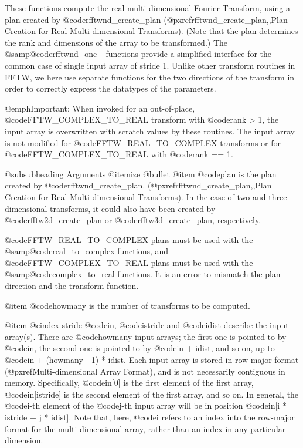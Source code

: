 These functions compute the real multi-dimensional Fourier Transform,
using a plan created by @code{rfftwnd_create_plan}
(@pxref{rfftwnd_create_plan,,Plan Creation for Real Multi-dimensional
Transforms}). (Note that the plan determines the rank and dimensions of
the array to be transformed.)  The @samp{@code{rfftwnd_one_}} functions
provide a simplified interface for the common case of single input array
of stride 1.  Unlike other transform routines in FFTW, we here use
separate functions for the two directions of the transform in order to
correctly express the datatypes of the parameters.

@emph{Important:} When invoked for an out-of-place,
@code{FFTW_COMPLEX_TO_REAL} transform with @code{rank > 1}, the input
array is overwritten with scratch values by these routines.  The input
array is not modified for @code{FFTW_REAL_TO_COMPLEX} transforms or for
@code{FFTW_COMPLEX_TO_REAL} with @code{rank == 1}.

@subsubheading Arguments
@itemize @bullet
@item
@code{plan} is the plan created by @code{rfftwnd_create_plan}.
(@pxref{rfftwnd_create_plan,,Plan Creation for Real Multi-dimensional
Transforms}). In the case of two and three-dimensional transforms, it
could also have been created by @code{rfftw2d_create_plan} or
@code{rfftw3d_create_plan}, respectively.

@code{FFTW_REAL_TO_COMPLEX} plans must be used with the
@samp{@code{real_to_complex}} functions, and @code{FFTW_COMPLEX_TO_REAL}
plans must be used with the @samp{@code{complex_to_real}} functions.  It
is an error to mismatch the plan direction and the transform function.

@item
@code{howmany} is the number of transforms to be computed.

@item
@cindex stride
@code{in}, @code{istride} and @code{idist} describe the input array(s).
There are @code{howmany} input arrays; the first one is pointed to by
@code{in}, the second one is pointed to by @code{in + idist}, and so on,
up to @code{in + (howmany - 1) * idist}.  Each input array is stored in
row-major format (@pxref{Multi-dimensional Array Format}), and is not
necessarily contiguous in memory.  Specifically, @code{in[0]} is the
first element of the first array, @code{in[istride]} is the second
element of the first array, and so on.  In general, the @code{i}-th
element of the @code{j}-th input array will be in position @code{in[i *
istride + j * idist]}. Note that, here, @code{i} refers to an index into
the row-major format for the multi-dimensional array, rather than an
index in any particular dimension.

